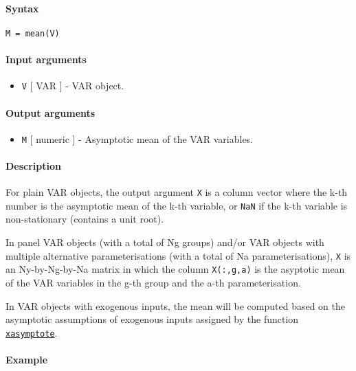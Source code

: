 


	\paragraph{Syntax}\label{syntax}

\begin{verbatim}
M = mean(V)
\end{verbatim}

\paragraph{Input arguments}\label{input-arguments}

\begin{itemize}
\itemsep1pt\parskip0pt
\item
  \texttt{V} {[} VAR {]} - VAR object.
\end{itemize}

\paragraph{Output arguments}\label{output-arguments}

\begin{itemize}
\itemsep1pt\parskip0pt
\item
  \texttt{M} {[} numeric {]} - Asymptotic mean of the VAR variables.
\end{itemize}

\paragraph{Description}\label{description}

For plain VAR objects, the output argument \texttt{X} is a column vector
where the k-th number is the asymptotic mean of the k-th variable, or
\texttt{NaN} if the k-th variable is non-stationary (contains a unit
root).

In panel VAR objects (with a total of Ng groups) and/or VAR objects with
multiple alternative parameterisations (with a total of Na
parameterisations), \texttt{X} is an Ny-by-Ng-by-Na matrix in which the
column \texttt{X(:,g,a)} is the asyptotic mean of the VAR variables in
the g-th group and the a-th parameterisation.

In VAR objects with exogenous inputs, the mean will be computed based on
the asymptotic assumptions of exogenous inputs assigned by the function
\href{VAR/xasymptote}{\texttt{xasymptote}}.

\paragraph{Example}\label{example}



